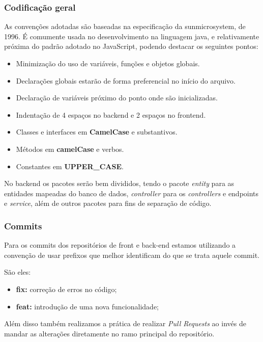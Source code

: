 \subsubsection{Codificação geral}
As convenções adotadas são baseadas na especificação da \gls{sunmicrosystem}, de 1996. É comumente usada no desenvolvimento na linguagem java, e relativamente próxima do padrão adotado no JavaScript, podendo destacar os seguintes pontos:

\begin{itemize}
    \item Minimização do uso de variáveis, funções e objetos globais.
    \item Declarações globais estarão de forma preferencial no início do arquivo.
    \item Declaração de variáveis próximo do ponto onde são inicializadas.
    \item Indentação de 4 espaços no \gls{backend} e 2 espaços no \gls{frontend}.
    \item Classes e interfaces em \textbf{CamelCase} e substantivos.
    \item Métodos em \textbf{camelCase} e verbos.
    \item Constantes em \textbf{UPPER\_CASE}.
\end{itemize}

No \gls{backend} os pacotes serão bem divididos, tendo o pacote \emph{entity} para as entidades mapeadas do banco de dados, \emph{controller} para os \emph{controllers} e \glspl{endpoint} e \emph{service}, além de outros pacotes para fins de separação de código.

\subsubsection{Commits}
Para os commits dos repositórios de front e back-end estamos utilizando a convenção de usar prefixos que melhor identificam do que se trata aquele commit.

São eles:
\begin{itemize}
	\item \textbf{fix:} correção de erros no código;
	\item \textbf{feat:} introdução de uma nova funcionalidade;
\end{itemize}

Além disso também realizamos a prática de realizar \emph{Pull Requests} ao invés de mandar as alterações diretamente no ramo principal do repositório.

